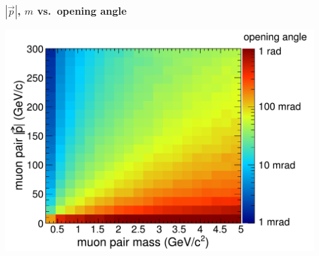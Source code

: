 \documentclass[compress]{beamer}
\begin{document}
\begin{frame}
\frametitle{$|\vec{p}|$, $m$ vs.\ opening angle}
\includegraphics[width=\linewidth]{openingangle_angle.pdf}
\end{frame}
\end{document}
